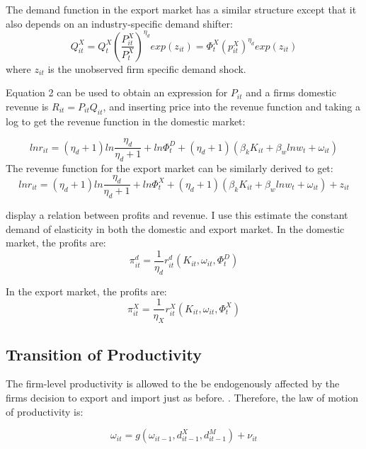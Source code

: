 \documentclass[11pt]{article}
\begin{document}
The demand function in the export market has a similar structure
except that it also depends on an industry-specific demand shifter: 
\begin{equation}
Q_{it}^{X} =
Q_{t}^{X}(\frac{P_{it}^{X}}{P_{t}^{X}})^{\eta_{d}}exp(z_{it})= \Phi_{t}^{X} (p_{it}^{X})^{\eta_{d}}exp(z_{it})
\end{equation} 
where $z_{it}$ is the unobserved firm specific demand
shock. 

Equation 2 can be used to obtain an expression for $P_{it}$ and a
firms domestic revenue is $R_{it} = P_{it}Q_{it}$, and inserting price
into the revenue function and taking a log to get the revenue function
in the domestic market:

\begin{equation}
ln r_{it} = (\eta_{d} +1) ln \frac{\eta_{d}}{\eta_{d} +1}  + ln
\Phi_{t}^{D} + (\eta_{d} +1)(\beta_{k}K_{it} + \beta_{w} ln w_{t} +
\omega_{it}) 
\end{equation}
 The revenue function for the export market can be similarly derived
 to get:
\begin{equation}
ln r_{it} = (\eta_{d} +1) ln \frac{\eta_{d}}{\eta_{d} +1}  + ln
\Phi_{t}^{X} + (\eta_{d} +1)(\beta_{k}K_{it} + \beta_{w} ln w_{t} +
\omega_{it})  +  z_{it}
\end{equation}


\cite{das2007market} display a relation between profits and revenue. I
use this estimate the constant demand of elasticity in both the
domestic and export market. 
In the domestic market, the profits are: 
\begin{equation}
\pi_{it}^d = \frac{1}{\eta_{d}} r_{it}^{d}(K_{it}, \omega_{it}, \Phi_{t}^{D})
\end{equation} 

In the export market, the profits are: 
\begin{equation}
\pi_{it}^X = \frac{1}{\eta_{X}} r_{it}^{X}(K_{it}, \omega_{it}, \Phi_{t}^{X})
\end{equation} 

\subsection{Transition of Productivity}

The firm-level productivity is allowed to the be endogenously affected
by the firms decision to export and import just as before. . Therefore, the law of
motion of productivity is:

\begin{equation}
\omega_{it} = g(\omega_{it-1}, d_{it-1}^{X}, d_{it-1}^{M}) + \nu_{it}
\end{equation}
\end{document}
